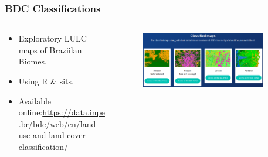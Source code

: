 \documentclass[aspectratio=169]{beamer}
\begin{document}
\begin{frame}
    \frametitle{BDC Classifications}
    \begin{columns}
        \begin{column}{0.5\textwidth}
            \begin{itemize}
                \item Exploratory LULC maps of Braziilan Biomes. 
                \item Using R \& sits.
                \item Available online:\newline \scriptsize{\url{https://data.inpe.br/bdc/web/en/land-use-and-land-cover-classification/}}
            \end{itemize}
        \end{column}
        \begin{column}{0.5\textwidth}
            \begin{figure}
                \centering
                \includegraphics[width=0.9\textwidth]
                {img/brazil_data_cube_classifications.png}
            \end{figure}
        \end{column}
    \end{columns}
\end{frame}
\end{document}
